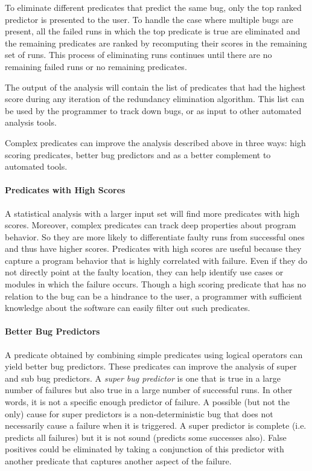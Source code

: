 To eliminate different predicates that predict the same bug, only the top ranked predictor is presented to the user.  To handle the case where multiple bugs are present, all the failed runs in which the top predicate is true are eliminated and the remaining predicates are ranked by recomputing their scores in the remaining set of runs.  This process of eliminating runs continues until there are no remaining failed runs or no remaining predicates.  

The output of the analysis will contain the list of predicates that had the highest score during any iteration of the redundancy elimination algorithm.  This list can be used by the programmer to track down bugs, or as input to other automated analysis tools.
 
Complex predicates can improve the analysis described above in three ways: high scoring predicates, better bug predictors and as a better complement to automated tools.

\paragraph{Predicates with High Scores}

A statistical analysis with a larger input set will find more predicates with high scores.  Moreover, complex predicates can track deep properties about program behavior.  So they are more likely to differentiate faulty runs from successful ones and thus have higher scores.  Predicates with high scores are useful because they capture a program behavior that is highly correlated with failure.  Even if they do not directly point at the faulty location, they can help identify use cases or modules in which the failure occurs.  Though a high scoring predicate that has no relation to the bug can be a hindrance to the user, a programmer with sufficient knowledge about the software can easily filter out such predicates.

\paragraph{Better Bug Predictors}

A predicate obtained by combining simple predicates using logical operators can yield better bug predictors.  These predicates can improve the analysis of super and sub bug predictors.  A \emph{super bug predictor} is one that is true in a large number of failures but also true in a large number of successful runs.  In other words, it is not a specific enough predictor of failure.  A possible (but not the only) cause for super predictors is a non-deterministic bug that does not necessarily cause a failure when it is triggered.  A super predictor is complete (i.e. predicts all failures) but it is not sound (predicts some successes also).  False positives could be eliminated by taking a conjunction of this predictor with another predicate that captures another aspect of the failure.

